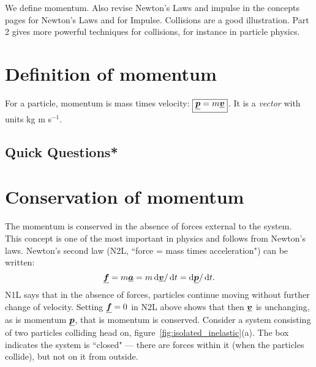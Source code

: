 



\addtolength{\topmargin}{-0.7 cm}
\setlength{\columnsep}{22pt}
\nll
We define momentum.  Also revise Newton's Laws and impulse in the concepts pages for Newton's Laws and for Impulse.  Collisions are a good illustration.  Part 2 gives more powerful techniques for collisions, for instance in particle physics.

\section{Definition of momentum}
For a particle, momentum is mass times velocity: $\boxed{\mathit{\underline{\boldsymbol{p}}} = m \mathit{\underline{\boldsymbol{v}}}}$.\nll
It is a \emph{vector} with units kg m s$^{-1}$.

\subsection{Quick Questions*}

\section{Conservation of momentum}
The momentum is conserved in the absence of forces external to the system.  \\
This concept is one of the most important in physics and follows from Newton's laws.  Newton's second law (N2L, ``force = mass times acceleration") can be written:
\begin{equation*} 
\mathit{\underline{\boldsymbol{f}}} = m \mathit{\underline{\boldsymbol{a}}} = m \operatorname{d}\!\mathit{\underline{\boldsymbol{v}}}/\operatorname{d}\! t = \operatorname{d}\!\mathit{\underline{\boldsymbol{p}}}/\operatorname{d}\! t .
\end{equation*}
N1L says that in the absence of forces, particles continue moving without further change of velocity.  Setting $\mathit{\underline{\boldsymbol{f}}}= 0$ in N2L above shows that then $\mathit{\underline{\boldsymbol{v}}}$ is unchanging, as is momentum $\mathit{\underline{\boldsymbol{p}}}$, that is momentum is conserved.\nll
Consider a system consisting of two particles colliding head on, figure~\ref{fig:isolated_inelastic}(a). The box indicates the system is ``closed" --- there are forces within it (when the particles collide), but not on it from outside.

